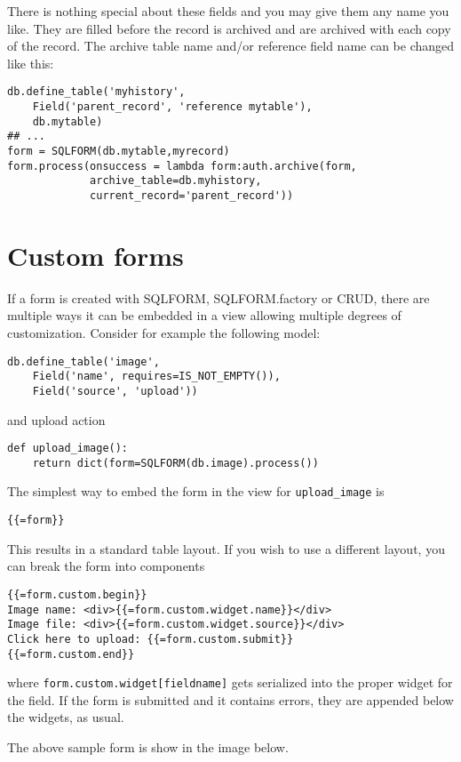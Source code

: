 \documentclass[justified,sixbynine,notoc]{tufte-book}
\def\ft{\small\tt}
\begin{document}
\begin{fullwidth}
There is nothing special about these fields and you may give them any name you like. They are filled before the record is archived and are archived with each copy of the record.  The archive table name and/or reference field name can be changed like this:

\begin{lstlisting}
db.define_table('myhistory',
    Field('parent_record', 'reference mytable'),
    db.mytable)
## ...
form = SQLFORM(db.mytable,myrecord)
form.process(onsuccess = lambda form:auth.archive(form,
             archive_table=db.myhistory,
             current_record='parent_record'))
\end{lstlisting}

\goodbreak\section{Custom forms}

If a form is created with SQLFORM, SQLFORM.factory or CRUD, there are multiple ways it can be embedded in a view allowing multiple degrees of customization. Consider for example the following model:
\begin{lstlisting}
db.define_table('image',
    Field('name', requires=IS_NOT_EMPTY()),
    Field('source', 'upload'))
\end{lstlisting}
\noindent and upload action
\begin{lstlisting}
def upload_image():
    return dict(form=SQLFORM(db.image).process())
\end{lstlisting}

The simplest way to embed the form in the view for {\ft upload\_image} is
\begin{lstlisting}[keywords={}]
{{=form}}
\end{lstlisting}

This results in a standard table layout. If you wish to use a different layout, you can break the form into components
\begin{lstlisting}[keywords={}]
{{=form.custom.begin}}
Image name: <div>{{=form.custom.widget.name}}</div>
Image file: <div>{{=form.custom.widget.source}}</div>
Click here to upload: {{=form.custom.submit}}
{{=form.custom.end}}
\end{lstlisting}
\noindent where {\ft form.custom.widget[fieldname]} gets serialized into the proper widget for the field. If the form is submitted and it contains errors, they are appended below the widgets, as usual.

The above sample form is show in the image below.



\end{fullwidth}
\end{document}
